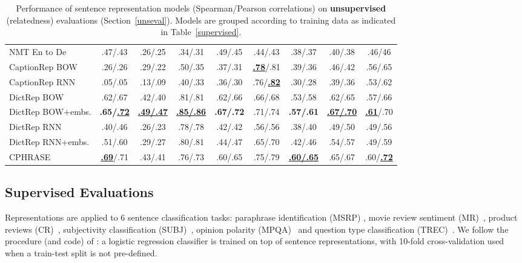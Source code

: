 \begin{table*}[ht]
\begin{center}
{\begin{tabular}{l|cccccc|c|c}
          NMT En to De & .47/.43 & .26/.25 & .34/.31 & .49/.45 & .44/.43 & .38/.37 & .40/.38  &.46/46 \\
          CaptionRep BOW & .26/.26 & .29/.22	& .50/.35	& .37/.31 &  \underline{ \bf .78}/.81 & .39/.36 & .46/.42 & .56/.65 \\
          CaptionRep RNN & .05/.05	& .13/.09	& .40/.33	& .36/.30	& .76/\underline{\bf .82}	& .30/.28 & .39/.36 & .53/.62\\
                    DictRep BOW & .62/.67 	&.42/.40	&.81/.81	&.62/.66	&.66/.68	&.53/.58	&.62/.65 & .57/.66\\
          DictRep BOW+embs. & \bf .65/\underline{.72}	& \bf \underline{.49/.47}	& \bf  \underline{.85/.86}	& \bf  .67/.72	&.71/.74	& \bf .57/.61	&  \bf \underline{.67/.70}  & \underline{ {\bf .61}}/.70 \\
DictRep RNN & .40/.46	&.26/.23	&.78/.78	&.42/.42	&.56/.56	&.38/.40	&.49/.50 & .49/.56 \\
DictRep RNN+embs. & .51/.60	&.29/.27	&.80/.81	&.44/.47	&.65/.70	&.42/.46	&.54/.57 & .49/.59 \\
          \hline   
          CPHRASE & \underline{\bf .69}/.71 & .43/.41 & .76/.73  & .60/.65 & .75/.79 &  \bf \underline{.60/.65} &  .65/.67 & .60/\underline{\bf .72} \\
           
          \hline 
        \end{tabular}

    }
    \caption{\label{unsupervised} Performance of sentence representation models (Spearman/Pearson correlations) on {\bf unsupervised} (relatedness) evaluations (Section~\ref{unseval}). Models are grouped according to training data as indicated in Table~\ref{supervised}.}
  \end{center}
  \vspace*{-4ex} 
\end{table*}





\subsection{Supervised Evaluations}
\label{supersec}
Representations are applied to 6 sentence classification tasks: paraphrase identification (MSRP) \cite{dolan2004unsupervised}, movie review sentiment (MR)~\cite{pang2005seeing}, product reviews (CR)~\cite{hu2004mining}, subjectivity classification (SUBJ)~\cite{pang2004sentimental}, opinion polarity (MPQA)~\cite{wiebe2005annotating} and question type classification (TREC)~\cite{voorhees2002overview}. We follow the procedure (and code) of \cite{kiros2015skip}: a logistic regression classifier is trained on top of sentence representations, with 10-fold cross-validation used when a train-test split is not pre-defined. 

